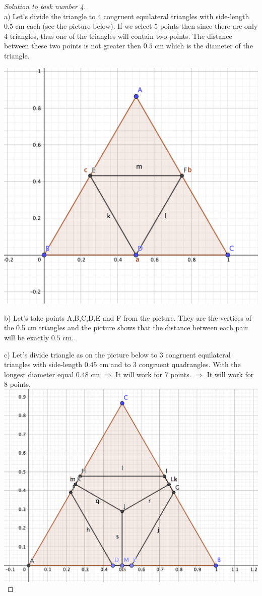 \documentclass[12pt,a4paper]{article}
\begin{document}
\begin{proof}[Solution to task number 4]
\
\\

a) Let's divide the triangle to $4$ congruent equilateral triangles with side-length $0.5$ cm each (see the picture below). If we select $5$ points then since there are only $4$ triangles, thus one of the triangles will contain two points. The distance between these two points is not greater then $0.5$ cm which is the diameter of the triangle.

\includegraphics[scale=0.4]{triangle}

b) Let's take points A,B,C,D,E and F from the picture. They are the vertices of the 0.5 cm triangles and the picture shows that the distance between each pair will be exactly $0.5$ cm.

c) Let's divide triangle as on the picture below to $3$ congruent equilateral triangles with side-length $0.45$ cm and to $3$ congruent quadrangles. With the longest diameter equal $0.48$ cm $ \Rightarrow$ It will work for $7$ points. $\Rightarrow$ It will work for $8$ points.\\
\includegraphics[scale=0.4]{p2}
\end{proof}
\end{document}
